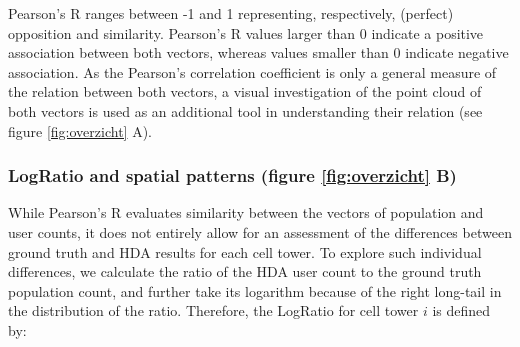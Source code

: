 \documentclass[a4paper]{article}
\begin{document}
Pearson's R ranges between -1 and 1 representing, respectively, (perfect) opposition and similarity. Pearson's R values larger than 0 indicate a positive association between both vectors, whereas values smaller than 0 indicate negative association. As the Pearson's correlation coefficient is only a general measure of the relation between both vectors, a visual investigation of the point cloud of both vectors is used as an additional tool in understanding their relation (see figure \ref{fig:overzicht} A).      








\subsubsection{LogRatio and spatial patterns (figure \ref{fig:overzicht} B)}
While Pearson's R evaluates similarity between the vectors of population and user counts, it does not entirely allow for an assessment of the differences between ground truth and HDA results for each cell tower. To explore such individual differences, we calculate the ratio of the HDA user count to the ground truth population count, and further take its logarithm because of the right long-tail in the distribution of the ratio. Therefore, the LogRatio for cell tower $i$ is defined by:
\end{document}
